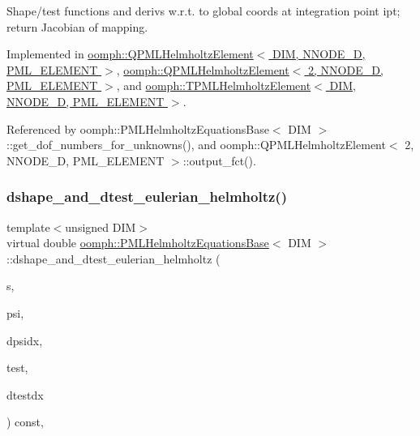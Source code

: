 Shape/test functions and derivs w.\+r.\+t. to global coords at integration point ipt; return Jacobian of mapping. 



Implemented in \hyperlink{classoomph_1_1QPMLHelmholtzElement_a89c593f771124ccb6e70b5abac7f709b}{oomph\+::\+Q\+P\+M\+L\+Helmholtz\+Element$<$ D\+I\+M, N\+N\+O\+D\+E\+\_\+D, P\+M\+L\+\_\+\+E\+L\+E\+M\+E\+N\+T $>$}, \hyperlink{classoomph_1_1QPMLHelmholtzElement_a89c593f771124ccb6e70b5abac7f709b}{oomph\+::\+Q\+P\+M\+L\+Helmholtz\+Element$<$ 2, N\+N\+O\+D\+E\+\_\+D, P\+M\+L\+\_\+\+E\+L\+E\+M\+E\+N\+T $>$}, and \hyperlink{classoomph_1_1TPMLHelmholtzElement_aef6adcd4002aa3fac6d5d45ac5ac779b}{oomph\+::\+T\+P\+M\+L\+Helmholtz\+Element$<$ D\+I\+M, N\+N\+O\+D\+E\+\_\+D, P\+M\+L\+\_\+\+E\+L\+E\+M\+E\+N\+T $>$}.



Referenced by oomph\+::\+P\+M\+L\+Helmholtz\+Equations\+Base$<$ D\+I\+M $>$\+::get\+\_\+dof\+\_\+numbers\+\_\+for\+\_\+unknowns(), and oomph\+::\+Q\+P\+M\+L\+Helmholtz\+Element$<$ 2, N\+N\+O\+D\+E\+\_\+D, P\+M\+L\+\_\+\+E\+L\+E\+M\+E\+N\+T $>$\+::output\+\_\+fct().

\mbox{\label{classoomph_1_1PMLHelmholtzEquationsBase_ad8b68169a39c90b30fb4340ce654a350}} 
\subsubsection{\texorpdfstring{dshape\+\_\+and\+\_\+dtest\+\_\+eulerian\+\_\+helmholtz()}{dshape\_and\_dtest\_eulerian\_helmholtz()}}
{\footnotesize\ttfamily template$<$unsigned D\+IM$>$ \\
virtual double \hyperlink{classoomph_1_1PMLHelmholtzEquationsBase}{oomph\+::\+P\+M\+L\+Helmholtz\+Equations\+Base}$<$ D\+IM $>$\+::dshape\+\_\+and\+\_\+dtest\+\_\+eulerian\+\_\+helmholtz (\begin{DoxyParamCaption}\item[{const \hyperlink{classoomph_1_1Vector}{Vector}$<$ double $>$ \&}]{s,  }\item[{\hyperlink{classoomph_1_1Shape}{Shape} \&}]{psi,  }\item[{\hyperlink{classoomph_1_1DShape}{D\+Shape} \&}]{dpsidx,  }\item[{\hyperlink{classoomph_1_1Shape}{Shape} \&}]{test,  }\item[{\hyperlink{classoomph_1_1DShape}{D\+Shape} \&}]{dtestdx }\end{DoxyParamCaption}) const\hspace{0.3cm}{\ttfamily [protected]}, {}}



